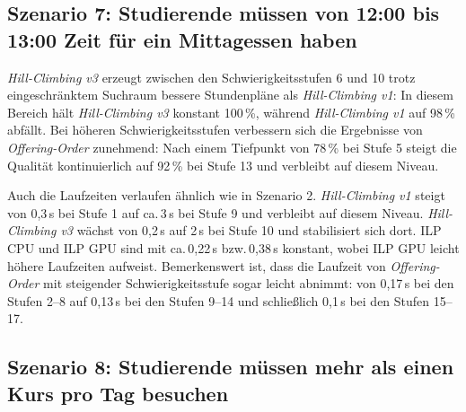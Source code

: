 \vspace{1cm}

\newpage


\subsection{Szenario 7: Studierende müssen von 12:00 bis 13:00 Zeit für ein Mittagessen haben}

\textit{Hill-Climbing v3} erzeugt zwischen den Schwierigkeitsstufen 6 und 10 trotz
eingeschränktem Suchraum bessere Stundenpläne als \textit{Hill-Climbing v1}: In diesem Bereich
hält \textit{Hill-Climbing v3} konstant 100\,\%, während \textit{Hill-Climbing v1} auf 98\,\%
abfällt. Bei höheren Schwierigkeitsstufen verbessern sich die Ergebnisse von
\textit{Offering-Order} zunehmend: Nach einem Tiefpunkt von 78\,\% bei Stufe 5 steigt die
Qualität kontinuierlich auf 92\,\% bei Stufe 13 und verbleibt auf diesem Niveau.

\vspace{1cm}

\newpage

Auch die Laufzeiten verlaufen ähnlich wie in Szenario 2. \textit{Hill-Climbing v1} steigt von
0{,}3\,s bei Stufe 1 auf ca.\,3\,s bei Stufe 9 und verbleibt auf diesem Niveau.
\textit{Hill-Climbing v3} wächst von 0{,}2\,s auf 2\,s bei Stufe 10 und stabilisiert sich
dort. ILP CPU und ILP GPU sind mit ca.\,0{,}22\,s bzw.\,0{,}38\,s konstant, wobei ILP GPU
leicht höhere Laufzeiten aufweist. Bemerkenswert ist, dass die Laufzeit von
\textit{Offering-Order} mit steigender Schwierigkeitsstufe sogar leicht abnimmt: von 0{,}17\,s
bei den Stufen 2--8 auf 0{,}13\,s bei den Stufen 9--14 und schließlich 0{,}1\,s bei den
Stufen 15--17.

\vspace{1cm}

\newpage


\subsection{Szenario 8: Studierende müssen mehr als einen Kurs pro Tag besuchen}

